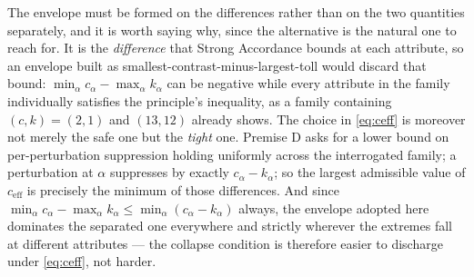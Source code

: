 \documentclass[11pt]{article}
\theoremstyle{definition}
\begin{document}
The envelope must be formed on the differences rather than on the two quantities separately, and it is worth saying why, since the alternative is the natural one to reach for. It is the \emph{difference} that Strong Accordance bounds at each attribute, so an envelope built as smallest-contrast-minus-largest-toll would discard that bound: $\min_\alpha c_\alpha - \max_\alpha k_\alpha$ can be negative while every attribute in the family individually satisfies the principle's inequality, as a family containing $(c,k) = (2,1)$ and $(13,12)$ already shows. The choice in \eqref{eq:ceff} is moreover not merely the safe one but the \emph{tight} one. Premise D asks for a lower bound on per-perturbation suppression holding uniformly across the interrogated family; a perturbation at $\alpha$ suppresses by exactly $c_\alpha - k_\alpha$; so the largest admissible value of $c_{\mathrm{eff}}$ is precisely the minimum of those differences. And since $\min_\alpha c_\alpha - \max_\alpha k_\alpha \le \min_\alpha(c_\alpha - k_\alpha)$ always, the envelope adopted here dominates the separated one everywhere and strictly wherever the extremes fall at different attributes --- the collapse condition is therefore easier to discharge under \eqref{eq:ceff}, not harder.
\end{document}

